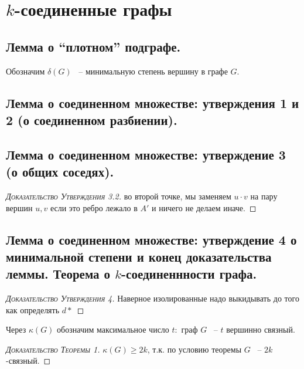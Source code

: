 \newpage

\section{$k$-соединенные графы}

\subsection{Лемма о “плотном” подграфе.}

\begin{df*}
	Обозначим $\delta(G)$ ~-- минимальную степень вершину в графе  $G$.
\end{df*}

\subsection{Лемма о соединенном множестве: утверждения 1 и 2 (о соединенном разбиении).}
\subsection{Лемма о соединенном множестве: утверждение 3 (о общих соседях).}

\begin{proof}[\normalfont\textsc{Доказательство Утверждения 3.2}]
	во второй точке, мы заменяем $u \cdot v$ на пару вершин  $u, v$ если это ребро лежало в  $A'$ и ничего не делаем иначе.
\end{proof}

\subsection{Лемма о соединенном множестве: утверждение 4 о минимальной степени и конец доказательства леммы. Теорема о $k$-соединеннности графа.}


\begin{proof}[\normalfont\textsc{Доказательство Утверждения 4}]
	Наверное изолированные надо выкидывать до того как определять $d*$
\end{proof}

\begin{df*}
	Через $\kappa(G)$ обозначим максимальное число $t\colon$ граф  $G$ ~-- $t$ вершинно связный.
\end{df*}


\begin{proof}[\normalfont\textsc{Доказательство Теоремы 1}]
	$\kappa(G) \geq 2k$, т.к. по условию теоремы  $G$ ~-- $2k$-связный.
\end{proof}

